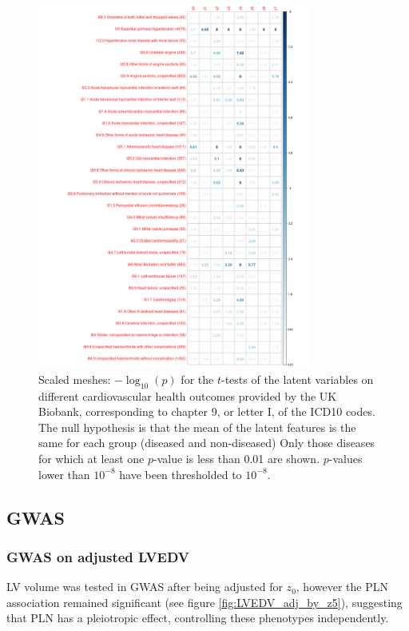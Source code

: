 \begin{figure}
\includegraphics[width=0.8\textwidth]{figs/diseases/experiment_1_health_outcome_t-test}
\caption{Scaled meshes: $-\log_{10}(p)$ for the $t$-tests of the latent variables on different cardiovascular health outcomes provided by the UK Biobank, corresponding to chapter 9, or letter I, of the ICD10 codes. The null hypothesis is that the mean of the latent features is the same for each group (diseased and non-diseased) Only those diseases for which at least one $p$-value is less than 0.01 are shown. $p$-values lower than $10^{-8}$ have been thresholded to $10^{-8}$.}
\label{fig:health_outcomes_scaled}
\end{figure}

\subsection{GWAS}

\subsubsection{GWAS on adjusted LVEDV}
LV volume was tested in GWAS after being adjusted for $z_0$, however the PLN association remained significant (see figure \ref{fig:LVEDV_adj_by_z5}), suggesting that PLN has a pleiotropic effect, controlling these phenotypes independently.

